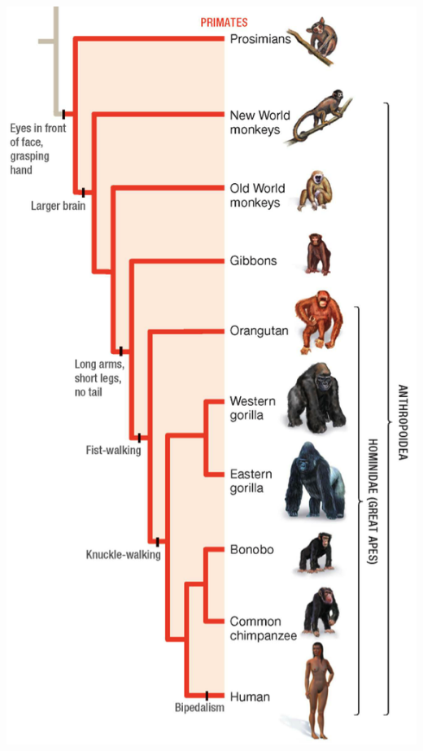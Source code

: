 {\begin{frame}[t]
\begin{adjustwidth}{-2em}{-1.5em}
\begin{columns}[t]
            \vspace{-2mm}
            \begin{center}
                \includegraphics[height=\textheight]{primate-tree.png}
            \end{center}

        \end{columns}
    \end{adjustwidth}
\end{frame}
}

